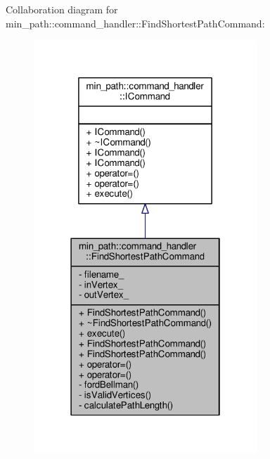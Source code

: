 Collaboration diagram for min\+\_\+path\+:\+:command\+\_\+handler\+:\+:Find\+Shortest\+Path\+Command\+:
\nopagebreak
\begin{figure}[H]
\begin{center}
\leavevmode
\includegraphics[width=238pt]{d1/d6e/a00073}
\end{center}
\end{figure}
